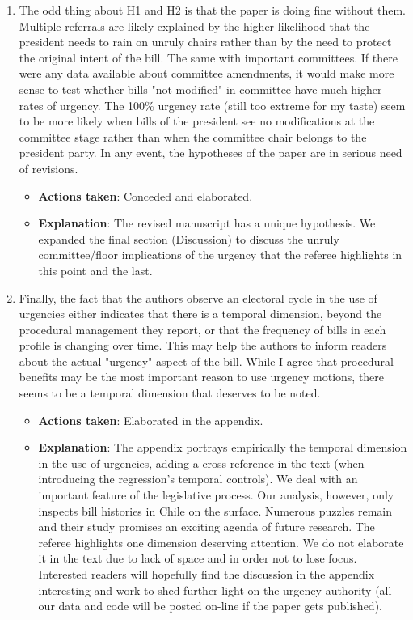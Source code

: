 \documentclass[article,letterpaper,times,12pt,listings-bw,microtype]{article}
\begin{document}
\begin{enumerate}
\begin{itemize}
\end{itemize}
\item The odd thing about H1 and H2 is that the paper is doing fine without them. Multiple referrals are likely explained by the higher likelihood that the president needs to rain on unruly chairs rather than by the need to protect the original intent of the bill. The same with important committees. If there were any data available about committee amendments, it would make more sense to test whether bills "not modified" in committee have much higher rates of urgency. The 100\% urgency rate (still too extreme for my taste) seem to be more likely when bills of the president see no modifications at the committee stage rather than when the committee chair belongs to the president party. In any event, the hypotheses of the paper are in serious need of revisions.
\label{sec:org1fd7ae5}
\begin{itemize}
\item \textbf{Actions taken}: Conceded and elaborated.
\item \textbf{Explanation}: The revised manuscript has a unique hypothesis. We expanded the final section (Discussion) to discuss the unruly committee/floor implications of the urgency that the referee highlights in this point and the last.
\end{itemize}
\item Finally, the fact that the authors observe an electoral cycle in the use of urgencies either indicates that there is a temporal dimension, beyond the procedural management they report, or that the frequency of bills in each profile is changing over time. This may help the authors to inform readers about the actual "urgency" aspect of the bill. While I agree that procedural benefits may be the most important reason to use urgency motions, there seems to be a temporal dimension that deserves to be noted.
\label{sec:org11080e3}
\begin{itemize}
\item \textbf{Actions taken}: Elaborated in the appendix.
\item \textbf{Explanation}: The appendix portrays empirically the temporal dimension in the use of urgencies, adding a cross-reference in the text (when introducing the regression's temporal controls). We deal with an important feature of the legislative process. Our analysis, however, only inspects bill histories in Chile on the surface. Numerous puzzles remain and their study promises an exciting agenda of future research. The referee highlights one dimension deserving attention. We do not elaborate it in the text due to lack of space and in order not to lose focus. Interested readers will hopefully find the discussion in the appendix interesting and work to shed further light on the urgency authority (all our data and code will be posted on-line if the paper gets published).

\end{itemize}
\end{enumerate}
\end{document}
